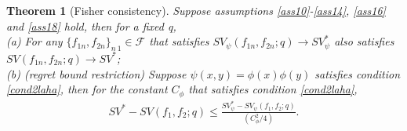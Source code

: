 \documentclass[10pt]{article}
\newtheorem{thm}{Theorem}
\theoremstyle{remark} \newtheorem{rem}{Remark}
\begin{document}
\begin{thm}[Fisher consistency]
    Suppose assumptions \ref{ass10}-\ref{ass14}, \ref{ass16} and \ref{ass18} hold, then for a fixed q, \\
    (a) For any $\{f_{1n},f_{2n}\}_{n\>1} \in \mathcal{F}$ that satisfies  $SV_\psi(f_{1n}, f_{2n};q) \to SV_\psi^*$ also satisfies $SV(f_{1n},f_{2n};q) \rightarrow SV^*$; \\
    (b) (regret bound restriction) Suppose $\psi(x,y)=\phi(x)\phi(y)$ satisfies condition \ref{cond2laha}, then for the constant $C_\phi$ that satisfies condition \ref{cond2laha}, 
    \begin{align}
        SV^* - SV(f_1,f_2;q) \leq \frac{SV_\psi^* - SV_\psi(f_1, f_2;q)}{{(C_\phi^2/4)}}.
    \end{align}
    \label{fishercon}
\end{thm}
\end{document}
